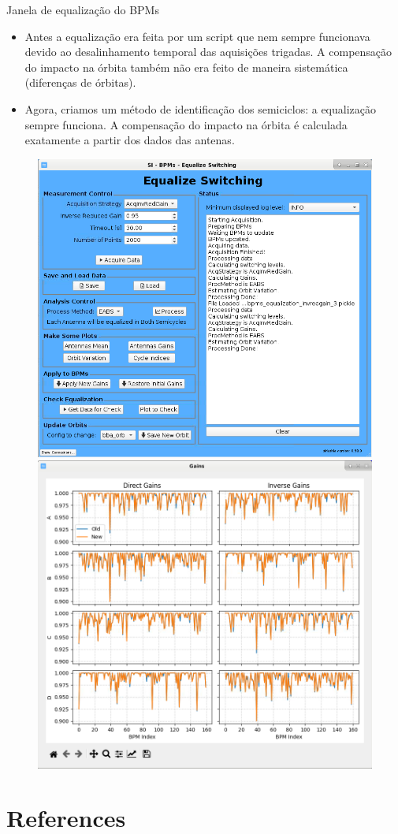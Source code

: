 \documentclass{beamer}					  %
\begin{document}
\begin{frame}{Janela de equalização do BPMs}
    \begin{itemize}
        \scriptsize
        \item Antes a equalização era feita por um script que nem sempre funcionava devido ao desalinhamento temporal das aquisições trigadas. A compensação do impacto na órbita também não era feito de maneira sistemática (diferenças de órbitas).
        \item Agora, criamos um método de identificação dos semiciclos: a equalização sempre funciona. A compensação do impacto na órbita é calculada exatamente a partir dos dados das antenas.
    \end{itemize}
    \begin{figure}[H]
   		\centering
        \includegraphics[width=.48\textwidth]{
            2023-12-12/figures/bpms_equalization_window.png}
        \includegraphics[width=.48\textwidth]{2023-12-12/figures/bpms_gains.png}
        \label{fig:bpmseq_window}
    \end{figure}
\end{frame}

\section{References}
\end{document}

